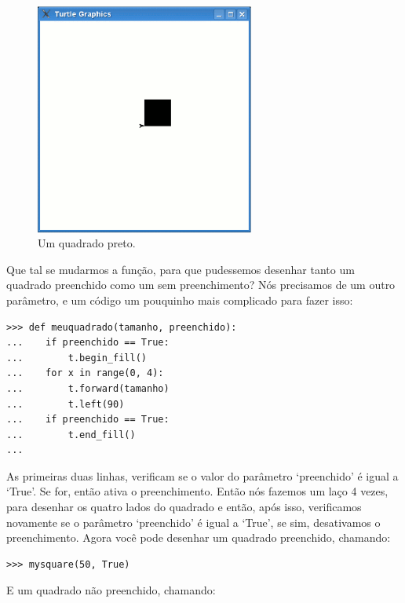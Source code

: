 \begin{figure}
\begin{center}
\includegraphics[width=72mm]{eps/figure27.eps}
\end{center}
\caption{Um quadrado preto.}\label{fig27}
\end{figure}

Que tal se mudarmos a função, para que pudessemos desenhar tanto um quadrado preenchido como um sem preenchimento? Nós precisamos de um outro parâmetro, e um código um pouquinho mais complicado para fazer isso:

\begin{listing}
\begin{verbatim}
>>> def meuquadrado(tamanho, preenchido):
...    if preenchido == True:
...        t.begin_fill()
...    for x in range(0, 4):
...        t.forward(tamanho)
...        t.left(90)
...    if preenchido == True:
...        t.end_fill()
...
\end{verbatim}
\end{listing}

As primeiras duas linhas, verificam se o valor do parâmetro `preenchido' é igual a `True'. Se for, então ativa o preenchimento. Então nós fazemos um laço 4 vezes, para desenhar os quatro lados do quadrado e então, após isso, verificamos novamente se o parâmetro `preenchido' é igual a `True', se sim, desativamos o preenchimento. Agora você pode desenhar um quadrado preenchido, chamando:

\begin{listing}
\begin{verbatim}
>>> mysquare(50, True)
\end{verbatim}
\end{listing}

\noindent
E um quadrado não preenchido, chamando:

